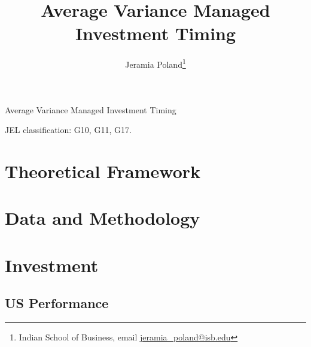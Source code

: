 \documentclass[11pt]{article}
\begin{document}
\doublespacing

\author{Jeramia Poland\thanks{\rm Indian School of Business, email \href{mailto:jeramia_poland@isb.edu}{jeramia\_poland@isb.edu} \newline
		\protect } }

\title{\Large \bf Average Variance Managed Investment Timing}

\date{}              %



\bigskip

\centerline{Average Variance Managed Investment Timing}


\medskip

\noindent JEL classification: G10, G11, G17.

\clearpage




\section{Theoretical Framework} \label{sec:theory}



\section{Data and Methodology} \label{sec:Data}



\section{Investment} \label{sec:asset_allocation}



\subsection{US Performance} \label{sec:port_performance}
\end{document}
